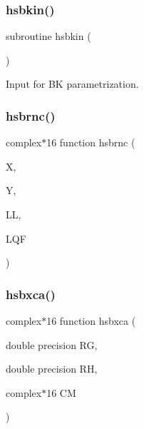 \mbox{\label{djangoh__h_8f_a5e61ca26c7b285c1b231be49df0c1fdb}} 
\subsubsection{\texorpdfstring{hsbkin()}{hsbkin()}}
{\footnotesize\ttfamily subroutine hsbkin (\begin{DoxyParamCaption}{ }\end{DoxyParamCaption})}



Input for BK parametrization. 

\mbox{\label{djangoh__h_8f_aad43c59ee9357789a332bbb961d55a34}} 
\subsubsection{\texorpdfstring{hsbrnc()}{hsbrnc()}}
{\footnotesize\ttfamily complex$\ast$16 function hsbrnc (\begin{DoxyParamCaption}\item[{}]{X,  }\item[{}]{Y,  }\item[{}]{LL,  }\item[{}]{L\+QF }\end{DoxyParamCaption})}

\mbox{\label{djangoh__h_8f_a22ad387aac25047b40cfa42010b03f18}} 
\subsubsection{\texorpdfstring{hsbxca()}{hsbxca()}}
{\footnotesize\ttfamily complex$\ast$16 function hsbxca (\begin{DoxyParamCaption}\item[{double precision}]{RG,  }\item[{double precision}]{RH,  }\item[{complex$\ast$16}]{CM }\end{DoxyParamCaption})}

